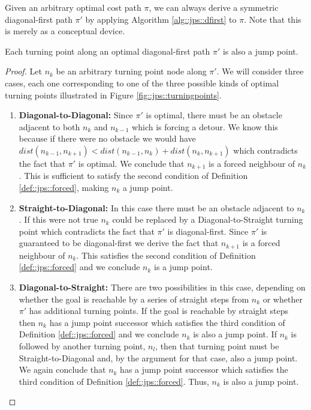 Given an arbitrary optimal cost path $\pi$, we can always derive a symmetric
diagonal-first path $\pi'$ by applying Algorithm \ref{alg::jps::dfirst} to $\pi$.
Note that this is merely as a conceptual device.



\begin{lemma}
\label{lemma::jps::turningpoints}
Each turning point along an optimal diagonal-first path $\pi'$ is also a jump point.
\end{lemma}
\begin{proof}
Let $n_{k}$ be an arbitrary turning point node along $\pi'$. 
We will consider three cases, each one corresponding to one of the three
possible kinds of optimal turning points illustrated in Figure \ref{fig::jps::turningpoints}. 

\begin{enumerate}
\item{
\textbf{Diagonal-to-Diagonal:} Since $\pi'$ is optimal, there must be an
obstacle adjacent to both $n_{k}$ and $n_{k-1}$ which is forcing a detour.
We know this because if there were no obstacle we would have 
$dist(n_{k-1}, n_{k+1}) < dist(n_{k-1}, n_{k}) + dist(n_{k}, n_{k+1})$ which contradicts
the fact that $\pi'$ is optimal.
We conclude that $n_{k+1}$ is a forced neighbour of $n_{k}$.
This is sufficient to satisfy the second condition of Definition
\ref{def::jps::forced}, making $n_{k}$ a jump point.
}

\item{
\textbf{Straight-to-Diagonal:} In this case there must be an 
obstacle adjacent to $n_{k}$. 
If this were not true $n_{k}$ could be replaced by a
Diagonal-to-Straight turning point which contradicts the fact that $\pi'$ is
diagonal-first.
Since $\pi'$ is guaranteed to be diagonal-first we derive the fact that $n_{k+1}$ is 
a forced neighbour of $n_{k}$.
This satisfies the second condition of Definition \ref{def::jps::forced} and we conclude
$n_{k}$ is a jump point.
}

\item{
\textbf{Diagonal-to-Straight:} There are two possibilities in this case, 
depending on whether the goal is reachable by a series of straight steps
from $n_{k}$ or whether $\pi'$ has additional turning points. If the goal
is reachable by straight steps then $n_{k}$ has a jump point successor which satisfies the
third condition of Definition \ref{def::jps::forced} and we conclude $n_{k}$ is
also a jump point.
If $n_{k}$ is followed by another turning point, $n_{l}$, then that turning
point must be Straight-to-Diagonal and, by the argument for that case, 
also a jump point.
We again conclude that $n_{k}$ has a jump point successor which satisfies
the third condition of Definition \ref{def::jps::forced}. Thus, $n_{k}$ is
also a jump point.
}
\end{enumerate}
\end{proof}

